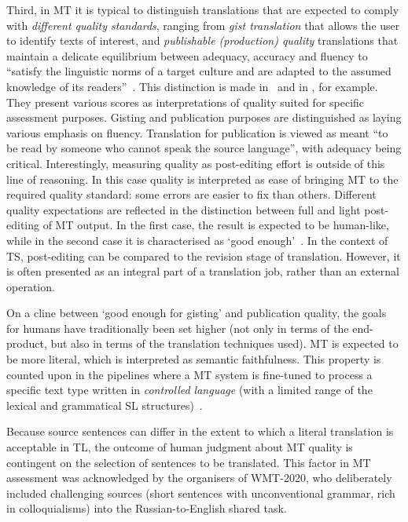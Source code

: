 Third, in MT it is typical to distinguish translations that are expected to comply with \textit{different quality standards}, ranging from \textit{gist translation} that allows the user to identify texts of interest, and \textit{publishable (production) quality} translations that maintain a delicate equilibrium between adequacy, accuracy and fluency to ``satisfy the linguistic norms of a target culture and are adapted to the assumed knowledge of its readers''~\cite[p.21]{Ahrenberg2017}. This distinction is made in~\citet{Scarton2016} and in \citet[p.43]{Specia2018a}, for example. They present various scores as interpretations of quality suited for specific assessment purposes. Gisting and publication purposes are distinguished as laying various emphasis on fluency. Translation for publication is viewed as meant ``to be read by someone who cannot speak the source language'', with adequacy being critical. Interestingly, measuring quality as post-editing effort is outside of this line of reasoning. In this case quality is interpreted as ease of bringing MT to the required quality standard: some errors are easier to fix than others. Different quality expectations are reflected in the distinction between full and light post-editing of MT output. In the first case, the result is expected to be human-like, while in the second case it is characterised as `good enough'~\cite{Massardo2016}.
In the context of TS, post-editing can be compared to the revision stage of translation. However, it is often presented as an integral part of a translation job, rather than an external operation. 

On a cline between `good enough for gisting' and publication quality, the goals for humans have traditionally been set higher (not only in terms of the end-product, but also in terms of the translation techniques used). MT is expected to be more literal, which is interpreted as semantic faithfulness. This property is counted upon in the pipelines where a MT system is fine-tuned to process a specific text type written in \textit{controlled language} (with a limited range of the lexical and grammatical SL structures)~\cite[p.17]{Gil2006}.
 
Because source sentences can differ in the extent to which a literal translation is acceptable in TL, the outcome of human judgment about MT quality is contingent on the selection of sentences to be translated. This factor in MT assessment was acknowledged by the organisers of WMT-2020, who deliberately included challenging sources (short sentences with unconventional grammar, rich in colloquialisms) into the Russian-to-English shared task.

